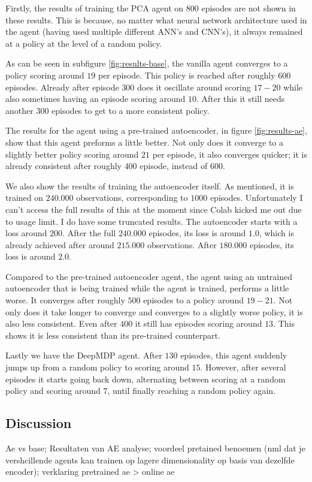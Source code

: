 Firstly, the results of training the PCA agent on $800$ episodes are not shown in these results. This is because, no matter what neural network architecture used in the agent (having used multiple different ANN's and CNN's), it always remained at a policy at the level of a random policy.

As can be seen in subfigure \ref{fig:results-base}, the vanilla agent converges to a policy scoring around $19$ per episode. This policy is reached after roughly $600$ episodes. Already after episode $300$ does it oscillate around scoring $17-20$ while also sometimes having an episode scoring around $10$. After this it still needs another $300$ episodes to get to a more consistent policy.

The results for the agent using a pre-trained autoencoder, in figure \ref{fig:results-ae}, show that this agent preforms a little better. Not only does it converge to a slightly better policy scoring around $21$ per episode, it also converges quicker; it is already consistent after roughly $400$ episode, instead of $600$. 

 We also show the results of training the autoencoder itself. As mentioned, it is trained on $240.000$ observations, corresponding to $1000$ episodes. Unfortunately I can't access the full results of this at the moment since Colab kicked me out due to usage limit. I do have some truncated results. The autoencoder starts with a loss around $200$. After the full $240.000$ episodes, its loss is around $1.0$, which is already achieved after around $215.000$ observations. After $180.000$ episodes, its loss is around $2.0$. 

Compared to the pre-trained autoencoder agent, the agent using an untrained autoencoder that is being trained while the agent is trained, performs a little worse. It converges after roughly $500$ episodes to a policy around $19-21$. Not only does it take longer to converge and converges to a slightly worse policy, it is also less consistent. Even after $400$ it still has episodes scoring around $13$. This shows it is less consistent than its pre-trained counterpart.

Lastly we have the DeepMDP agent. After $130$ episodes, this agent suddenly jumps up from a random policy to scoring around $15$. However, after several episodes it starts going back down, alternating between scoring at a random policy and scoring around $7$, until finally reaching a random policy again.

\subsection{Discussion}\label{research-discussion}
Ae vs base; Resultaten van AE analyse; voordeel pretained benoemen (nml dat je vershcillende agents kan trainen op lagere dimensionality op basis van dezelfde encoder); verklaring pretrained ae > online ae

